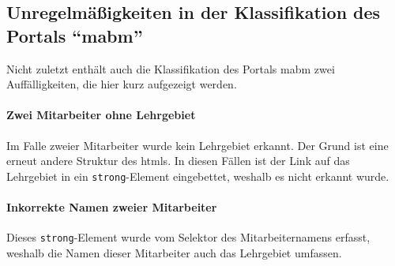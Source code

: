 \subsection{Unregelmäßigkeiten in der Klassifikation des Portals "`\gls{mabm}"'}
    Nicht zuletzt enthält auch die Klassifikation des Portals
    \gls{mabm}
    zwei Auffälligkeiten,
    die hier kurz aufgezeigt werden.

    \paragraph{Zwei Mitarbeiter ohne Lehrgebiet}
    Im Falle zweier Mitarbeiter wurde kein Lehrgebiet erkannt.
    Der Grund ist eine erneut andere Struktur des \glspl{html}.
    In diesen Fällen ist der Link auf das Lehrgebiet
    in ein \texttt{strong}-Element eingebettet, weshalb es nicht erkannt wurde.

    \paragraph{Inkorrekte Namen zweier Mitarbeiter}
    Dieses \texttt{strong}-Element wurde vom Selektor des Mitarbeiternamens erfasst,
    weshalb die Namen dieser Mitarbeiter auch das Lehrgebiet umfassen.
